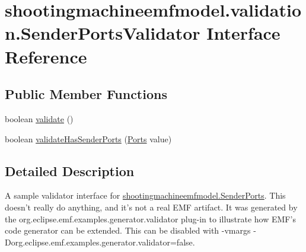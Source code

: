 \hypertarget{interfaceshootingmachineemfmodel_1_1validation_1_1_sender_ports_validator}{\section{shootingmachineemfmodel.\-validation.\-Sender\-Ports\-Validator Interface Reference}
\label{interfaceshootingmachineemfmodel_1_1validation_1_1_sender_ports_validator}
}
\subsection*{Public Member Functions}
\begin{DoxyCompactItemize}
\item 
boolean \hyperlink{interfaceshootingmachineemfmodel_1_1validation_1_1_sender_ports_validator_ae926360b3328f7ac2cd236216a4b583e}{validate} ()
\item 
boolean \hyperlink{interfaceshootingmachineemfmodel_1_1validation_1_1_sender_ports_validator_a827a251a1f2f19163dfe10cc51bb6384}{validate\-Has\-Sender\-Ports} (\hyperlink{interfaceshootingmachineemfmodel_1_1_ports}{Ports} value)
\end{DoxyCompactItemize}


\subsection{Detailed Description}
A sample validator interface for \hyperlink{interfaceshootingmachineemfmodel_1_1_sender_ports}{shootingmachineemfmodel.\-Sender\-Ports}. This doesn't really do anything, and it's not a real E\-M\-F artifact. It was generated by the org.\-eclipse.\-emf.\-examples.\-generator.\-validator plug-\/in to illustrate how E\-M\-F's code generator can be extended. This can be disabled with -\/vmargs -\/\-Dorg.\-eclipse.\-emf.\-examples.\-generator.\-validator=false. 

